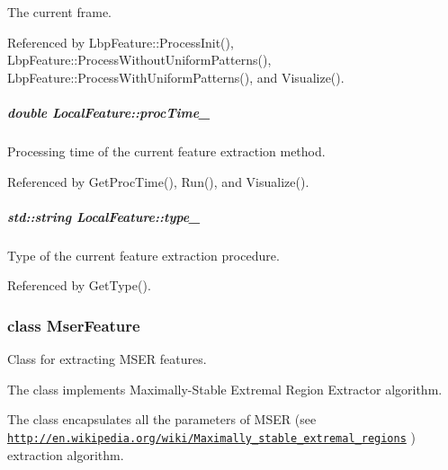 The current frame. 



Referenced by Lbp\-Feature\-::\-Process\-Init(), Lbp\-Feature\-::\-Process\-Without\-Uniform\-Patterns(), Lbp\-Feature\-::\-Process\-With\-Uniform\-Patterns(), and Visualize().

\hypertarget{group___feature_extractor_a79d60ce90ab8e6ccd66ff8f7da2365c7}{
\subparagraph[{proc\-Time\-\_\-}]{\setlength{\rightskip}{0pt plus 5cm}double Local\-Feature\-::proc\-Time\-\_\-\hspace{0.3cm}{\ttfamily [protected]}}}\label{group___feature_extractor_a79d60ce90ab8e6ccd66ff8f7da2365c7}


Processing time of the current feature extraction method. 



Referenced by Get\-Proc\-Time(), Run(), and Visualize().

\hypertarget{group___feature_extractor_aaf3aef30088cd1be80e1770d0a9d945b}{
\subparagraph[{type\-\_\-}]{\setlength{\rightskip}{0pt plus 5cm}std\-::string Local\-Feature\-::type\-\_\-\hspace{0.3cm}{\ttfamily [protected]}}}\label{group___feature_extractor_aaf3aef30088cd1be80e1770d0a9d945b}


Type of the current feature extraction procedure. 



Referenced by Get\-Type().

\label{class_mser_feature}
\hypertarget{group___feature_extractor_class_mser_feature}{}
\subsubsection{class Mser\-Feature}
Class for extracting M\-S\-E\-R features. 

\begin{DoxyVerb}The class implements Maximally-Stable Extremal Region Extractor algorithm.
\end{DoxyVerb}
 The class encapsulates all the parameters of M\-S\-E\-R (see \href{http://en.wikipedia.org/wiki/Maximally_stable_extremal_regions}{\tt http\-://en.\-wikipedia.\-org/wiki/\-Maximally\-\_\-stable\-\_\-extremal\-\_\-regions} ) extraction algorithm. 


